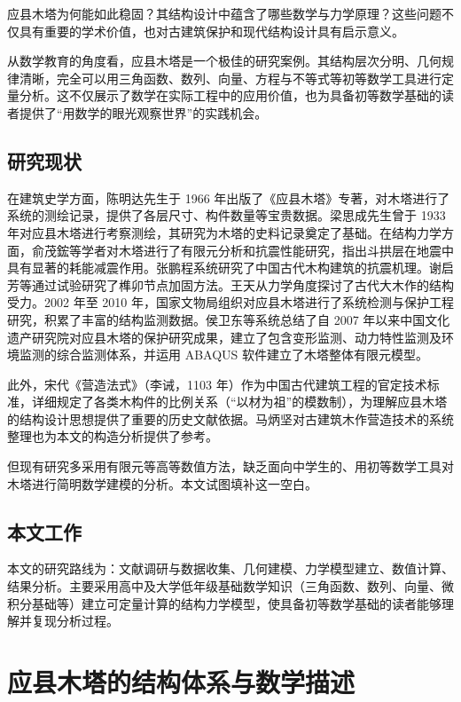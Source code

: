 \documentclass[12pt,a4paper,UTF8]{ctexart}
\begin{document}
应县木塔为何能如此稳固？其结构设计中蕴含了哪些数学与力学原理？这些问题不仅具有重要的学术价值，也对古建筑保护和现代结构设计具有启示意义。

从数学教育的角度看，应县木塔是一个极佳的研究案例。其结构层次分明、几何规律清晰，完全可以用三角函数、数列、向量、方程与不等式等初等数学工具进行定量分析。这不仅展示了数学在实际工程中的应用价值，也为具备初等数学基础的读者提供了“用数学的眼光观察世界”的实践机会。

\subsection{研究现状}

在建筑史学方面，陈明达先生于 1966 年出版了《应县木塔》专著，对木塔进行了系统的测绘记录，提供了各层尺寸、构件数量等宝贵数据\cite{chen1966}。梁思成先生曾于 1933 年对应县木塔进行考察测绘，其研究为木塔的史料记录奠定了基础\cite{liang2005}。在结构力学方面，俞茂鋐等学者对木塔进行了有限元分析和抗震性能研究，指出斗拱层在地震中具有显著的耗能减震作用\cite{fang2001}。张鹏程系统研究了中国古代木构建筑的抗震机理\cite{zhang2003}。谢启芳等通过试验研究了榫卯节点加固方法\cite{xie2008}。王天从力学角度探讨了古代大木作的结构受力\cite{wang1992}。2002 年至 2010 年，国家文物局组织对应县木塔进行了系统检测与保护工程研究，积累了丰富的结构监测数据。侯卫东等\cite{hou2016}系统总结了自 2007 年以来中国文化遗产研究院对应县木塔的保护研究成果，建立了包含变形监测、动力特性监测及环境监测的综合监测体系，并运用 ABAQUS 软件建立了木塔整体有限元模型。

此外，宋代《营造法式》（李诫，1103 年）\cite{li1103}作为中国古代建筑工程的官定技术标准，详细规定了各类木构件的比例关系（“以材为祖”的模数制），为理解应县木塔的结构设计思想提供了重要的历史文献依据。马炳坚\cite{ma1991}对古建筑木作营造技术的系统整理也为本文的构造分析提供了参考。

但现有研究多采用有限元等高等数值方法，缺乏面向中学生的、用初等数学工具对木塔进行简明数学建模的分析。本文试图填补这一空白。

\subsection{本文工作}

本文的研究路线为：文献调研与数据收集、几何建模、力学模型建立、数值计算、结果分析。主要采用高中及大学低年级基础数学知识（三角函数、数列、向量、微积分基础等）建立可定量计算的结构力学模型，使具备初等数学基础的读者能够理解并复现分析过程。

\section{应县木塔的结构体系与数学描述}
\label{sec:structure}
\end{document}
